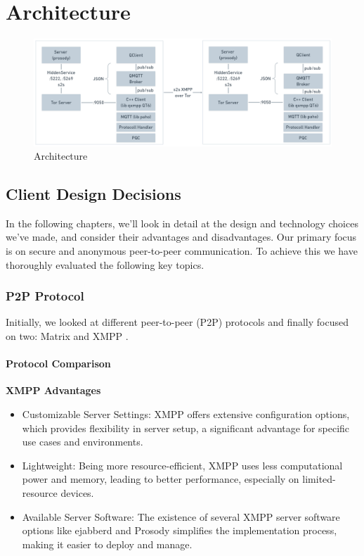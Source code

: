 \chapter{Architecture}

\begin{figure}[H]
	\centering
	\includegraphics[width=1\linewidth]{resources/architecture.png}
	\caption{Architecture}
	\label{fig:architecture}
\end{figure}

\section {Client Design Decisions}

In the following chapters, we'll look in detail at the design and technology choices we've made, and consider their advantages and disadvantages.
Our primary focus is on secure and anonymous peer-to-peer communication. To achieve this we have thoroughly evaluated the following key topics.

\subsection{P2P Protocol}
\label{sec:p2pprotocol}
Initially, we looked at different peer-to-peer (P2P) protocols and finally focused on two: Matrix \cite{matrix2023website} and XMPP \cite{xmpp2023website}.


\subsubsection*{Protocol Comparison}

\textbf{XMPP Advantages}
\begin{itemize}
\item Customizable Server Settings: XMPP offers extensive configuration options, which provides flexibility in server setup, a significant advantage for specific use cases and environments.
\item Lightweight: Being more resource-efficient, XMPP uses less computational power and memory, leading to better performance, especially on limited-resource devices.
\item Available Server Software: The existence of several XMPP server software options like ejabberd and Prosody simplifies the implementation process, making it easier to deploy and manage.
\end{itemize}


